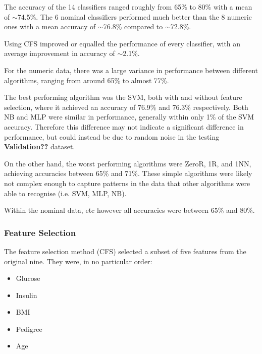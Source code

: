 The accuracy of the 14 classifiers ranged roughly from 65\% to 80\% with a mean of $\sim$74.5\%. The 6 nominal classifiers performed much better than the 8 numeric ones with a mean accuracy of $\sim$76.8\% compared to $\sim$72.8\%.

Using CFS improved or equalled the performance of every classifier, with an average improvement in accuracy of $\sim$2.1\%.

For the numeric data, there was a large variance in performance between different algorithms, ranging from around 65\% to almost 77\%.

The best performing algorithm was the SVM, both with and without feature selection, where it achieved an accuracy of 76.9\% and 76.3\% respectively. Both NB and MLP were similar in performance, generally within only 1\% of the SVM accuracy. Therefore this difference may not indicate a significant difference in performance, but could instead be due to random noise in the testing \textbf{Validation??} dataset.

On the other hand, the worst performing algorithms were ZeroR, 1R, and 1NN, achieving accuracies between 65\% and 71\%. These simple algorithms were likely not complex enough to capture patterns in the data that other algorithms were able to recognise (i.e. SVM, MLP, NB).


Within the nominal data, etc
however all accuracies were between 65\% and 80\%.






\subsubsection{Feature Selection}


The feature selection method (CFS) selected a subset of five features from the original nine. They were, in no particular order:

\begin{itemize}
    \item Glucose
    \item Insulin
    \item BMI
    \item Pedigree
    \item Age
\end{itemize}

